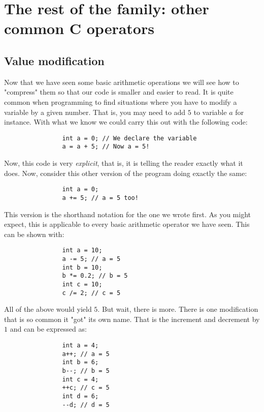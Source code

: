 \documentclass[12pt]{book}
\begin{document}
          \section{The rest of the family: other common C operators}
            \subsection{Value modification}
              Now that we have seen some basic arithmetic operations we will see how to "compress" them so that our code is smaller and easier to read. It is quite common when programming to find situations where you have to modify a variable by a given number. That is, you may need to add $5$ to variable $a$ for instance. With what we know we could carry this out with the following code:

              \begin{verbatim}
                int a = 0; // We declare the variable
                a = a + 5; // Now a = 5!
              \end{verbatim}

              Now, this code is very \textit{explicit}, that is, it is telling the reader exactly what it does. Now, consider this other version of the program doing exactly the same:

              \begin{verbatim}
                int a = 0;
                a += 5; // a = 5 too!
              \end{verbatim}

              This version is the shorthand notation for the one we wrote first. As you might expect, this is applicable to every basic arithmetic operator we have seen. This can be shown with:

              \begin{verbatim}
                int a = 10;
                a -= 5; // a = 5
                int b = 10;
                b *= 0.2; // b = 5
                int c = 10;
                c /= 2; // c = 5
              \end{verbatim}

              All of the above would yield $5$. But wait, there is more. There is one modification that is so common it "got" its own name. That is the increment and decrement by $1$ and can be expressed as:

              \begin{verbatim}
                int a = 4;
                a++; // a = 5
                int b = 6;
                b--; // b = 5
                int c = 4;
                ++c; // c = 5
                int d = 6;
                --d; // d = 5
              \end{verbatim}
\end{document}
